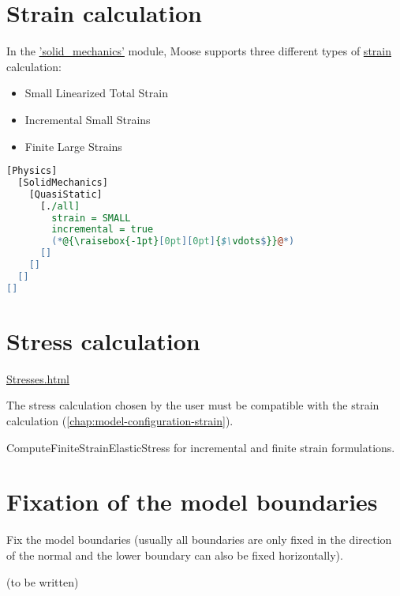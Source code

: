 \section{Strain calculation}
\label{chap:model-configuration-strain}

In the
\href{https://mooseframework.inl.gov/modules/solid_mechanics/}{'solid\_mechanics'}
module, Moose supports three different types of
\href{https://mooseframework.inl.gov/modules/solid_mechanics/Strains.html}{strain}
calculation:
\begin{itemize}
  \item {Small Linearized Total Strain}
  \item {Incremental Small Strains}
  \item {Finite Large Strains}
\end{itemize}

\begin{lstlisting}[language=perl, caption={Setting up incremental small strains within the Physics/SolidMechanics block},label={setup-incremental-small-strains}]
[Physics]
  [SolidMechanics]
    [QuasiStatic]
      [./all]
        strain = SMALL
        incremental = true
        (*@{\raisebox{-1pt}[0pt][0pt]{$\vdots$}}@*)
      []
    []
  []
[]
\end{lstlisting}

\section{Stress calculation}
\label{chap:model-configuration-stress}

\href{https://mooseframework.inl.gov/modules/solid_mechanics/Stresses.html}{Stresses.html}

The stress calculation chosen by the user must be compatible with the strain
calculation (\autoref{chap:model-configuration-strain}).

ComputeFiniteStrainElasticStress for incremental and finite strain
formulations.

\section{Fixation of the model boundaries}
\label{chap:model-configuration-boundary-fixities}

Fix the model boundaries (usually all boundaries are only fixed in the
direction of the normal and the lower boundary can also be fixed horizontally).

(to be written)
